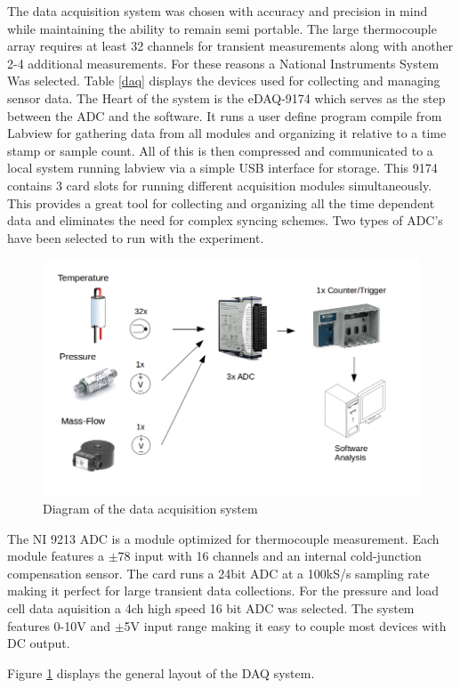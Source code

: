 \documentclass[paper=a4, fontsize=11pt, abstract=on]{scrartcl}
\numberwithin{equation}{section}		%
\numberwithin{figure}{section}			%
\numberwithin{table}{section}				%
\begin{document}
The data acquisition system was chosen with accuracy and precision in mind while maintaining the ability to remain semi portable. The large thermocouple array requires at least 32 channels for transient measurements along with another 2-4 additional measurements. For these reasons a National Instruments System Was selected. Table \ref{daq} displays the devices used for collecting and managing sensor data. The Heart of the system is the eDAQ-9174 which serves as the step between the ADC and the software. It runs a user define program compile from Labview for gathering data from all modules and organizing it relative to a time stamp or sample count. All of this is then compressed and communicated to a local system running labview via a simple USB interface for storage. This 9174 contains 3 card slots for running different acquisition modules simultaneously. This provides a great tool for collecting and organizing all the time dependent data and eliminates the need for complex syncing schemes. Two types of ADC's have been selected to run with the experiment. 


\begin{figure}[H]
\centering
\includegraphics[width=0.8\linewidth]{sch}
\caption{Diagram of the data acquisition system}
\label{daqd}
\end{figure}


The NI 9213 ADC is a module optimized for thermocouple measurement. Each module features a $\pm78$ input with 16 channels and an internal cold-junction compensation sensor. The card runs a 24bit ADC at a 100kS/s sampling rate making it perfect for large transient data collections. For the pressure and load cell data aquisition a 4ch high speed 16 bit ADC was selected. The system features 0-10V and $\pm$5V input range making it easy to couple most devices with DC output. 


Figure \ref{daqd} displays the general layout of the DAQ system.
\end{document}
